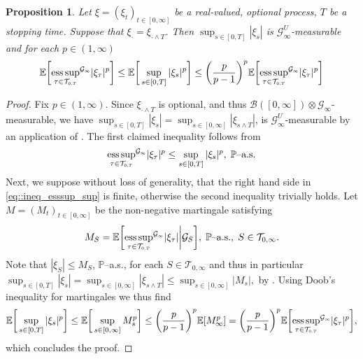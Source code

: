 \documentclass[10pt]{article} %
\newtheorem{proposition}[theorem]{Proposition}
\newcommand\cB{\mathcal B}
\newcommand\cG{\mathcal G}
\newcommand\cT{\mathcal T}
\newcommand{\smalltext}[1]{\text{\fontsize{4}{4}\selectfont$#1$}}
\def \E{\mathbb{E}}
\def \P{\mathbb{P}}
\begin{document}
\begin{proposition}\label{prop::equiv_integ_xi}
	Let $\xi = (\xi_t)_{t \in [0,\infty]}$ be a real-valued, optional process, $T$ be a stopping time. Suppose that $\xi_\cdot = \xi_{\cdot \land T}$. Then $\sup_{s \in [0,T]}|\xi_s|$ is $\cG^U_\infty$-measurable and for each $p \in (1,\infty)$
	\begin{equation}\label{eq::ineq_esssup_sup}
		\E\bigg[ \underset{\tau \in \cT_{\smalltext{0}\smalltext{,}\smalltext{T}}}{\rm ess\,sup}^{\cG_\smalltext{\infty}}|\xi_\tau|^p \bigg] \leq \E\bigg[\sup_{s \in [0,T]} |\xi_s|^p\bigg] \leq \bigg(\frac{p}{p-1}\bigg)^p \E\bigg[ \underset{\tau \in \cT_{\smalltext{0}\smalltext{,}\smalltext{T}}}{\rm ess\,sup}^{\cG_\smalltext{\infty}}|\xi_\tau|^p \bigg]
	\end{equation}
\end{proposition}

\begin{proof} 
	Fix $p \in (1,\infty)$. Since $\xi_{\cdot \land T}$ is optional, and thus $\cB([0,\infty]) \otimes \cG_\infty$-measurable, we have $\sup_{s \in [0,T]} |\xi_s| = \sup_{s \in [0,\infty]} |\xi_{s \land T}|$, is $\cG^U_\infty$-measurable by an application of \cite[Proposition 2.21]{karoui2013capacities}. The first claimed inequality follows from
	\begin{equation*}
		\underset{\tau \in \cT_{\smalltext{0}\smalltext{,}\smalltext{T}}}{\rm ess\,sup}^{\cG_\smalltext{\infty}} |\xi_\tau|^p \leq \sup_{s \in [0,T]} |\xi_s|^p, \; \text{$\P$--a.s.}
	\end{equation*}
	Next, we suppose without loss of generality, that the right hand side in \eqref{eq::ineq_esssup_sup} is finite, otherwise the second inequality trivially holds. Let $M = (M_t)_{t \in [0,\infty]}$ be the non-negative martingale satisfying
	\begin{equation*}
		M_S = \E\bigg[ \underset{\tau \in \cT_{\smalltext{0}\smalltext{,}\smalltext{T}}}{\rm ess\,sup}^{\cG_\smalltext{\infty}} |\xi_\tau| \bigg| \cG_S \bigg], \; \text{$\P$--a.s.}, \; S \in \cT_{0,\infty}.
	\end{equation*}
	Note that $|\xi_S| \leq M_S$, $\P$--a.s., for each $S \in \cT_{0,\infty}$ and thus in particular $\sup_{s \in [0,T]} |\xi_s| = \sup_{s \in [0,\infty]} |\xi_{s \land T}| \leq \sup_{s \in [0,\infty]} |M_s|,$
	by . Using Doob's inequality for martingales we thus find
	\begin{equation*}
		\E\bigg[\sup_{s \in [0,T]} |\xi_s|^p\bigg] \leq \E\bigg[\sup_{s \in [0,\infty]} M_s^p\bigg] \leq \bigg(\frac{p}{p-1}\bigg)^p\E[ M_\infty^p ] = \bigg(\frac{p}{p-1}\bigg)^p \E\bigg[\underset{\tau \in \cT_{\smalltext{0}\smalltext{,}\smalltext{T}}}{\rm ess\,sup}^{\cG_\smalltext{\infty}} |\xi_\tau|^p \bigg],
	\end{equation*}
	which concludes the proof.
\end{proof}



{\small
}
\end{document}
